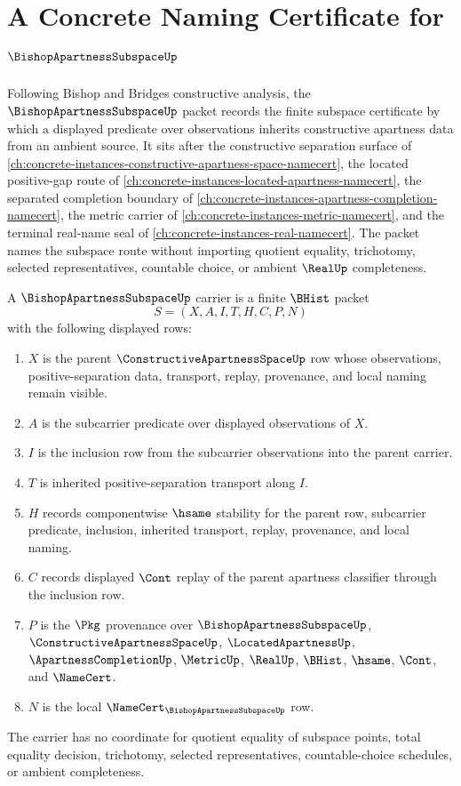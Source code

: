 \chapter{A Concrete Naming Certificate for $\BishopApartnessSubspaceUp$}
\label{ch:concrete-instances-bishop-apartness-subspace-namecert}

Following Bishop and Bridges constructive analysis, the $\BishopApartnessSubspaceUp$ packet records the finite subspace certificate by which a displayed predicate over observations inherits constructive apartness data from an ambient source. It sits after the constructive separation surface of \autoref{ch:concrete-instances-constructive-apartness-space-namecert}, the located positive-gap route of \autoref{ch:concrete-instances-located-apartness-namecert}, the separated completion boundary of \autoref{ch:concrete-instances-apartness-completion-namecert}, the metric carrier of \autoref{ch:concrete-instances-metric-namecert}, and the terminal real-name seal of \autoref{ch:concrete-instances-real-namecert}. The packet names the subspace route without importing quotient equality, trichotomy, selected representatives, countable choice, or ambient $\RealUp$ completeness.

\begin{definition}
\label{def:bishop-apartness-subspace-carrier}
A $\BishopApartnessSubspaceUp$ carrier is a finite $\BHist$ packet
$$
S=(X,A,I,T,H,C,P,N)
$$
with the following displayed rows:
\begin{enumerate}
\item $X$ is the parent $\ConstructiveApartnessSpaceUp$ row whose observations, positive-separation data, transport, replay, provenance, and local naming remain visible.
\item $A$ is the subcarrier predicate over displayed observations of $X$.
\item $I$ is the inclusion row from the subcarrier observations into the parent carrier.
\item $T$ is inherited positive-separation transport along $I$.
\item $H$ records componentwise $\hsame$ stability for the parent row, subcarrier predicate, inclusion, inherited transport, replay, provenance, and local naming.
\item $C$ records displayed $\Cont$ replay of the parent apartness classifier through the inclusion row.
\item $P$ is the $\Pkg$ provenance over $\BishopApartnessSubspaceUp$, $\ConstructiveApartnessSpaceUp$, $\LocatedApartnessUp$, $\ApartnessCompletionUp$, $\MetricUp$, $\RealUp$, $\BHist$, $\hsame$, $\Cont$, and $\NameCert$.
\item $N$ is the local $\NameCert_{\BishopApartnessSubspaceUp}$ row.
\end{enumerate}
The carrier has no coordinate for quotient equality of subspace points, total equality decision, trichotomy, selected representatives, countable-choice schedules, or ambient completeness.
\end{definition}


